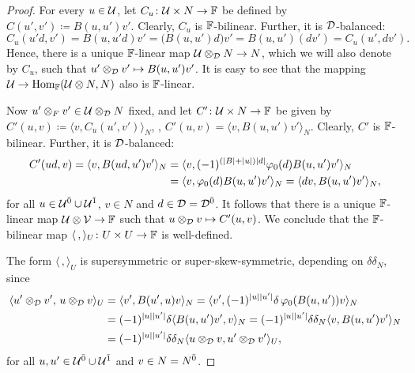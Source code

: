 \begin{proof}
    For every $u\in \mathcal U$, let $C_u \colon \mathcal U \times N \to \mathbb{F}$ be defined by $C(u', v') \coloneqq B(u, u') v'$. 
    Clearly, $C_u$ is $\mathbb{F}$-bilinear. 
    Further, it is $\mathcal{D}$-balanced:
    \[
        C_u(u'd, v') = B(u,u'd)v' = \big( B(u,u')d \big)v' = B(u, u') (d v') = C_u(u', dv').
    \]
    Hence, there is a unique $\mathbb{F}$-linear map $\mathcal U \otimes_{\mathcal{D}} N \to N$, which we will also denote by $C_u$, such that $u' \otimes_{\mathcal{D}} v' \mapsto B(u, u')v'$. 
    It is easy to see that the mapping $\mathcal U \to \operatorname{Hom}_{\mathbb{F}}(\mathcal U \otimes N, N)$ also is $\mathbb{F}$-linear. 
    
    Now $u'\otimes_F v' \in \mathcal U \otimes_{\mathcal{D}} N$ fixed, and let $C'\colon \mathcal U\times N \to \mathbb{F}$ be given by $C'(u,v) \coloneqq \langle v, C_u(u',v') \rangle_N$, \ie, $C'(u,v) = \langle v, B(u, u')v' \rangle_N$. 
    Clearly, $C'$ is $\mathbb{F}$-bilinear. 
    Further, it is $\mathcal{D}$-balanced:
    \begin{align}
        C'(ud,v) = \langle v, B(ud, u')v' \rangle_N &= \langle v, (-1)^{(|B| + |u|)|d|} \varphi_0(d) B(u, u')v' \rangle_N \\
        &= \langle v, \varphi_0(d) B(u, u')v' \rangle_N = \langle d v, B(u, u')v' \rangle_N,
    \end{align}
    for all $u \in \mathcal U^{\bar0} \cup \mathcal U^{\bar1}$, $v\in N$ and $d \in \mathcal{D} = \mathcal{D}^{\bar0}$.
    It follows that there is a unique $\mathbb{F}$-linear map $\mathcal U \otimes \mathcal V \to \mathbb{F}$ such that $u\otimes_{\mathcal{D}} v \mapsto C' (u,v)$. 
    We conclude that the $\mathbb{F}$-bilinear map $\langle \, , \rangle_U \colon U\times U \to \mathbb{F}$ is well-defined. 
    
    The form $\langle \, , \rangle_U$ is supersymmetric or super-skew-symmetric, depending on $\delta \delta_N$, since
    \begin{align}
        \langle u' \otimes_{\mathcal{D}} v' ,\,  u \otimes_{\mathcal{D}} v \rangle_U 
        &= \langle v' , B(u', u) v \rangle_N 
        = \langle v' , (-1)^{|u||u'|}\delta\, \varphi_0( B(u, u') ) v \rangle_N \\
        &= (-1)^{|u||u'|}\delta \langle B(u, u') v' , v \rangle_N 
        = (-1)^{|u||u'|} \delta \delta_N \langle v, B(u, u') v' \rangle_N \\
        &= (-1)^{|u||u'|} \delta \delta_N \langle u \otimes_{\mathcal{D}} v , u' \otimes_{\mathcal{D}} v' \rangle_U, 
    \end{align}
    for all $u, u' \in \mathcal U^{\bar0} \cup \mathcal U^{\bar1}$ and $v \in N = N^{\bar0}$.
    

\end{proof}
